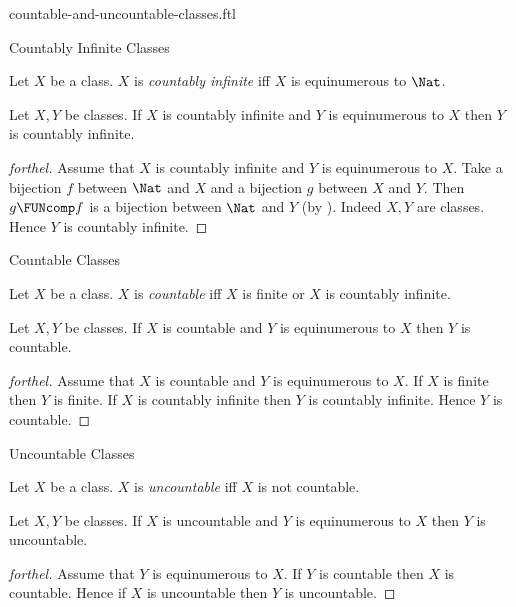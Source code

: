 \documentclass{stex}
\begin{document}
\begin{smodule}{countable-and-uncountable-classes.ftl}

\begin{sfragment}{Countably Infinite Classes}
  \begin{definition}[forthel]
    Let $X$ be a class.
    $X$ is \emph{countably infinite} iff $X$ is equinumerous to $\Nat$.
  \end{definition}

  \begin{proposition}[forthel]
    Let $X, Y$ be classes.
    If $X$ is countably infinite and $Y$ is equinumerous to $X$ then $Y$ is countably infinite.
  \end{proposition}
  \begin{proof}[forthel]
    Assume that $X$ is countably infinite and $Y$ is equinumerous to $X$.
    Take a bijection $f$ between $\Nat$ and $X$ and a bijection $g$ between $X$ and $Y$.
    Then $g \FUNcomp f$ is a bijection between $\Nat$ and $Y$ (by ).
    Indeed $X, Y$ are classes.
    Hence $Y$ is countably infinite.
  \end{proof}
\end{sfragment}

\begin{sfragment}{Countable Classes}
  \begin{definition}[forthel]
    Let $X$ be a class.
    $X$ is \emph{countable} iff $X$ is finite or $X$ is countably infinite.
  \end{definition}

  \begin{proposition}[forthel]
    Let $X, Y$ be classes.
    If $X$ is countable and $Y$ is equinumerous to $X$ then $Y$ is countable.
  \end{proposition}
  \begin{proof}[forthel]
    Assume that $X$ is countable and $Y$ is equinumerous to $X$.
    If $X$ is finite then $Y$ is finite.
    If $X$ is countably infinite then $Y$ is countably infinite.
    Hence $Y$ is countable.
  \end{proof}
\end{sfragment}

\begin{sfragment}{Uncountable Classes}
  \begin{definition}[forthel]
    Let $X$ be a class.
    $X$ is \emph{uncountable} iff $X$ is not countable.
  \end{definition}

  \begin{proposition}[forthel]
    Let $X, Y$ be classes.
    If $X$ is uncountable and $Y$ is equinumerous to $X$ then $Y$ is uncountable.
  \end{proposition}
  \begin{proof}[forthel]
    Assume that $Y$ is equinumerous to $X$.
    If $Y$ is countable then $X$ is countable.
    Hence if $X$ is uncountable then $Y$ is uncountable.
  \end{proof}
\end{sfragment}
\end{smodule}
\end{document}
